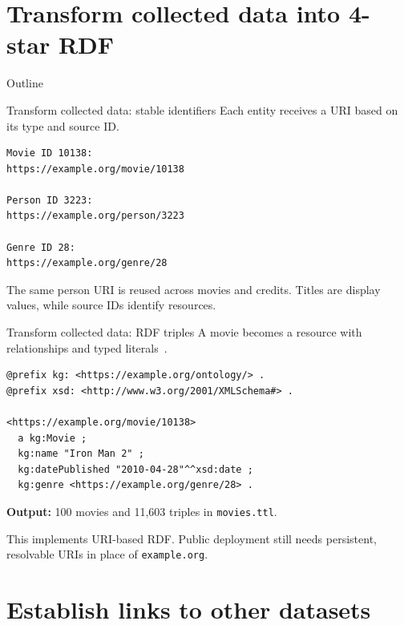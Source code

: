 \documentclass[aspectratio=169,xcolor=dvipsnames]{beamer}
\begin{document}

\section{Transform collected data into 4-star RDF}

\begin{frame}{Outline}
    \tableofcontents[currentsection]
\end{frame}


\begin{frame}[fragile]{Transform collected data: stable identifiers}
Each entity receives a URI based on its type and source ID.
\begin{lstlisting}
Movie ID 10138:
https://example.org/movie/10138

Person ID 3223:
https://example.org/person/3223

Genre ID 28:
https://example.org/genre/28
\end{lstlisting}
The same person URI is reused across movies and credits.
Titles are display values, while source IDs identify resources.
\end{frame}


\begin{frame}[fragile]{Transform collected data: RDF triples}
\small
A movie becomes a resource with relationships and typed literals~\cite{w3c2014rdf11}.
\begin{lstlisting}
@prefix kg: <https://example.org/ontology/> .
@prefix xsd: <http://www.w3.org/2001/XMLSchema#> .

<https://example.org/movie/10138>
  a kg:Movie ;
  kg:name "Iron Man 2" ;
  kg:datePublished "2010-04-28"^^xsd:date ;
  kg:genre <https://example.org/genre/28> .
\end{lstlisting}
\textbf{Output:} 100 movies and 11,603 triples in \texttt{movies.ttl}.
\medskip

This implements URI-based RDF. Public deployment still needs persistent,
resolvable URIs in place of \texttt{example.org}.
\end{frame}


\section{Establish links to other datasets}
\end{document}

